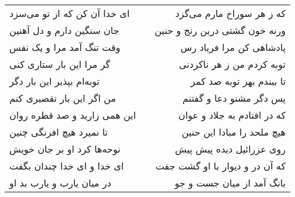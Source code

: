 \begin{center}
\begin{longtable}{l p{0.5cm} r}
ای خدا آن کن که از تو می‌سزد
&&
که ز هر سوراخ مارم می‌گزد
\\
جان سنگین دارم و دل آهنین
&&
ورنه خون گشتی درین رنج و حنین
\\
وقت تنگ آمد مرا و یک نفس
&&
پادشاهی کن مرا فریاد رس
\\
گر مرا این بار ستاری کنی
&&
توبه کردم من ز هر ناکردنی
\\
توبه‌ام بپذیر این بار دگر
&&
تا ببندم بهر توبه صد کمر
\\
من اگر این بار تقصیری کنم
&&
پس دگر مشنو دعا و گفتنم
\\
این همی زارید و صد قطره روان
&&
که در افتادم به جلاد و عوان
\\
تا نمیرد هیچ افرنگی چنین
&&
هیچ ملحد را مبادا این حنین
\\
نوحه‌ها کرد او بر جان خویش
&&
روی عزرائیل دیده پیش پیش
\\
ای خدا و ای خدا چندان بگفت
&&
که آن در و دیوار با او گشت جفت
\\
در میان یارب و یارب بد او
&&
بانگ آمد از میان جست و جو
\\
\end{longtable}
\end{center}
